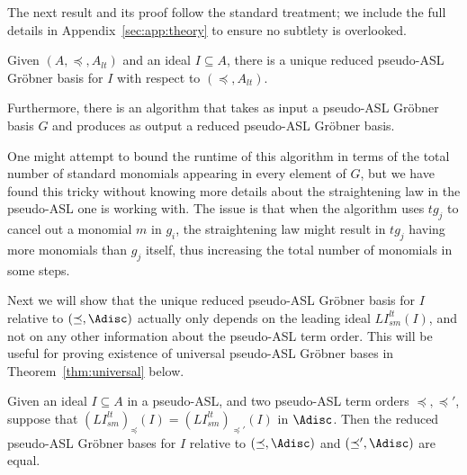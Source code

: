 \documentclass[11pt,reqno]{amsart}
\newcommand{\lismlt}{LI_{sm}^{lt}}
\theoremstyle{definition}
\numberwithin{equation}{section}
\begin{document}
The next result and its proof follow the standard treatment; we include the full details in Appendix~\ref{sec:app:theory} to ensure no subtlety is overlooked.

\begin{theorem}[store=thmreduced, note={Existence, uniqueness, and algorithm for reduced pseudo-ASL Gröbner bases}] 
\label{thm:reduced}
Given $(A, \preceq, A_{lt})$ and an ideal $I \subseteq A$, there is a unique reduced pseudo-ASL Gröbner basis for $I$ with respect to $(\preceq, A_{lt})$.

Furthermore, there is an algorithm that takes as input a pseudo-ASL Gröbner basis $G$ and produces as output a reduced pseudo-ASL Gröbner basis.
\end{theorem}

One might attempt to bound the runtime of this algorithm in terms of the total number of standard monomials appearing in every element of $G$, but we have found this tricky without knowing more details about the straightening law in the pseudo-ASL one is working with. The issue is that when the algorithm uses $t g_j$ to cancel out a monomial $m$ in $g_i$, the straightening law might result in $tg_j$ having more monomials than $g_j$ itself, thus increasing the total number of monomials in some steps.

Next we will show that the unique reduced pseudo-ASL Gröbner basis for $I$ relative to $(\preceq, \Adisc)$ actually only depends on the leading ideal $\lismlt(I)$, and not on any other information about the pseudo-ASL term order. This will be useful for proving existence of universal pseudo-ASL Gröbner bases in Theorem~\ref{thm:universal} below. 

\begin{lemma} \label{lem:reduced-Adisc}
Given an ideal $I \subseteq A$ in a pseudo-ASL, and two pseudo-ASL term orders $\preceq, \preceq'$, suppose that $(\lismlt)_{\preceq}(I) = (\lismlt)_{\preceq'}(I)$ in $\Adisc$. Then the reduced pseudo-ASL Gröbner bases for $I$ relative to $(\preceq, \Adisc)$ and $(\preceq',\Adisc)$ are equal.
\end{lemma}
\end{document}
